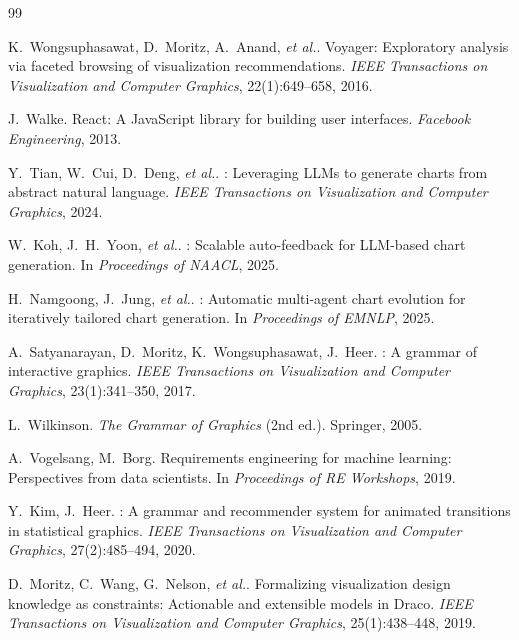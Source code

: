 \documentclass[12pt,a4paper]{ctexart}
\theoremstyle{remark}
\newcommand{\etal}{\textit{et al.}}
\begin{document}
\begin{thebibliography}{99}

K.~Wongsuphasawat, D.~Moritz, A.~Anand, \etal.
\newblock Voyager: Exploratory analysis via faceted browsing of visualization recommendations.
\newblock \textit{IEEE Transactions on Visualization and Computer Graphics}, 22(1):649--658, 2016.

J.~Walke.
\newblock React: A {JavaScript} library for building user interfaces.
\newblock \textit{Facebook Engineering}, 2013.

Y.~Tian, W.~Cui, D.~Deng, \etal.
: Leveraging {LLMs} to generate charts from abstract natural language.
\newblock \textit{IEEE Transactions on Visualization and Computer Graphics}, 2024.

W.~Koh, J.~H.~Yoon, \etal.
: Scalable auto-feedback for {LLM}-based chart generation.
\newblock In \textit{Proceedings of NAACL}, 2025.

H.~Namgoong, J.~Jung, \etal.
: Automatic multi-agent chart evolution for iteratively tailored chart generation.
\newblock In \textit{Proceedings of EMNLP}, 2025.

A.~Satyanarayan, D.~Moritz, K.~Wongsuphasawat, J.~Heer.
: A grammar of interactive graphics.
\newblock \textit{IEEE Transactions on Visualization and Computer Graphics}, 23(1):341--350, 2017.

L.~Wilkinson.
\newblock \textit{The Grammar of Graphics} (2nd ed.).
\newblock Springer, 2005.

A.~Vogelsang, M.~Borg.
\newblock Requirements engineering for machine learning: Perspectives from data scientists.
\newblock In \textit{Proceedings of RE Workshops}, 2019.

Y.~Kim, J.~Heer.
: A grammar and recommender system for animated transitions in statistical graphics.
\newblock \textit{IEEE Transactions on Visualization and Computer Graphics}, 27(2):485--494, 2020.

D.~Moritz, C.~Wang, G.~Nelson, \etal.
\newblock Formalizing visualization design knowledge as constraints: Actionable and extensible models in {Draco}.
\newblock \textit{IEEE Transactions on Visualization and Computer Graphics}, 25(1):438--448, 2019.


\end{thebibliography}
\end{document}
